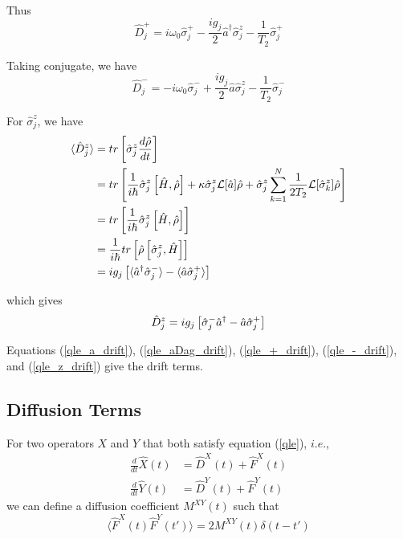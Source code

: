\documentclass{article}
\newcommand{\lindblad}{\mathcal{L}}
\newcommand{\szj}{\hat{\sigma}^z_j}
\newcommand{\spj}{\hat{\sigma}^+_j}
\newcommand{\smj}{\hat{\sigma}^-_j}
\newcommand{\tila}{\hat{\tilde{a}}}
\newcommand{\tilspj}{\hat{\tilde{\sigma}}^+_j}
\begin{document}
Thus
\begin{equation}
\label{qle_+_drift}
    \hat{D}_j^+ = i\omega_0 \spj-\frac{ig_j}{2} \hat{a}^\dagger \szj - \frac{1}{T_2} \spj
\end{equation}

Taking conjugate, we have
\begin{equation}
\label{qle_-_drift}
    \hat{D}_j^- = -i\omega_0 \smj+\frac{ig_j}{2} \hat{a} \szj - \frac{1}{T_2} \smj
\end{equation}

For $\szj$, we have
\begin{align}
    \notag\langle \Hat{D}^z_j \rangle &= tr\left[\szj \frac{d\hat{\rho}}{dt}\right]\\
    \notag &= tr\left[\frac{1}{i\hbar}\szj \left[\Hat{H}, \Hat{\rho}\right]+\kappa\szj\lindblad[\hat{a}]\hat{\rho}+\szj\sum^{N}_{k=1}\frac{1}{2T_2}\lindblad[\hat{\sigma}^z_k]\hat{\rho}\right]\\
    \notag &= tr\left[\frac{1}{i\hbar}\szj\left[\Hat{H}, \Hat{\rho}\right]\right]\\
    \notag &= \frac{1}{i\hbar}tr\left[\Hat{\rho}\left[\szj, \Hat{H}\right]\right]\\
    &= ig_j\left[\langle \hat{a}^\dagger \smj \rangle - \langle \hat{a} \spj \rangle\right]
\end{align}

which gives
\begin{equation}
\label{qle_z_drift}
   \hat{D}_j^z  = ig_j\left[\smj \Hat{a}^\dagger   -  \Hat{a} \spj \right]
\end{equation}

Equations (\ref{qle_a_drift}), (\ref{qle_aDag_drift}), (\ref{qle_+_drift}), (\ref{qle_-_drift}), and (\ref{qle_z_drift}) give the drift terms.
\subsection{Diffusion Terms}
For two operators $X$ and $Y$ that both satisfy equation (\ref{qle}), $i.e.$, 
\begin{align}
    \frac{d}{dt}\hat{X}(t) &= \hat{D}^X(t) + \hat{F}^X(t)\\
    \frac{d}{dt}\hat{Y}(t) &= \hat{D}^Y(t) + \hat{F}^Y(t)
\end{align}
we can define a diffusion coefficient $M^{XY}(t)$ such that
\begin{equation}
    \langle \hat{F}^X(t) \hat{F}^Y(t') \rangle = 2 M^{XY}(t) \delta(t-t')
\end{equation}
\end{document}
